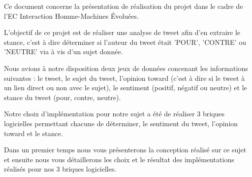 	\par Ce document concerne la présentation de réalisation du projet dans le cadre de l'EC Interaction Homme-Machines Évoluées.  
	\par L'objectif de ce projet est de réaliser une analyse de tweet afin d'en extraire le stance, c'est à dire déterminer si l'auteur du tweet était 'POUR', 'CONTRE' ou 'NEUTRE' via à vis d'un sujet donnée.\\ 
	\par Nous avions à notre disposition deux jeux de données concenant les informations suivantes : le tweet, le sujet du tweet, l'opinion toward (c'est à dire si le tweet à un lien direct ou non avec le sujet), le sentiment (positif, négatif ou neutre) et le stance du tweet (pour, contre, neutre). 
	\par Notre choix d'implémentation pour notre sujet a été de réaliser 3 briques logicielles permettant chacune de déterminer, le sentiment du tweet, l'opinion toward et le stance. \\
	\par Dans un premier temps nous vous présenterons la conception réalisé sur ce sujet et ensuite nous vous détaillerons les choix et le résultat des implémentations réalisés pour nos 3 briques logicielles.
